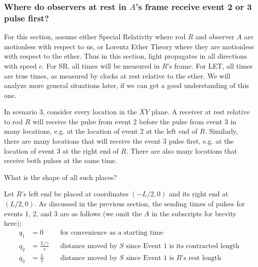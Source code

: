 \documentclass[a4paper]{article}
\theoremstyle{plain}
\theoremstyle{definition}
\begin{document}
%


\subsubsection{Where do observers at rest in $A$'s frame receive event 2 or 3 pulse first?}
\label{sec:scen3-restpulsefirst}

For this section, assume either Special Relativity where rod $R$ and
observer $A$ are motionless with respect to us, or Lorentz Ether
Theory where they are motionless with respect to the ether.  Thus in
this section, light propagates in all directions with speed $c$.  For
SR, all times will be measured in $R$'s frame.  For LET, all times are
true times, as measured by clocks at rest relative to the ether.  We
will analyze more general situations later, if we can get a good
understanding of this one.

In scenario 3, consider every location in the $XY$ plane.  A receiver
at rest relative to rod $R$ will receive the pulse from event 2 before
the pulse from event 3 in many locations, e.g. at the location of
event 2 at the left end of $R$.  Similarly, there are many locations
that will receive the event 3 pulse first, e.g. at the location of
event 3 at the right end of $R$.  There are also many locations that
receive both pulses at the same time.

What is the shape of all such places?

Let $R$'s left end be placed at coordinates $(-L/2,0)$ and its right
end at $(L/2,0)$.
As discussed in the previous section, the sending times of pulses for
events 1, 2, and 3 are as follows (we omit the $A$ in the subscripts
for brevity here);
\begin{align*}
q_1 & = 0 & & \text{for convenience as a starting time} \\
q_2 & = \frac{L/\gamma}{v} & & \text{distance moved by $S$ since Event 1 is its contracted length} \\
q_3 & = \frac{L}{v} & & \text{distance moved by $S$ since Event 1 is $R$'s rest length}
\end{align*}
\end{document}
